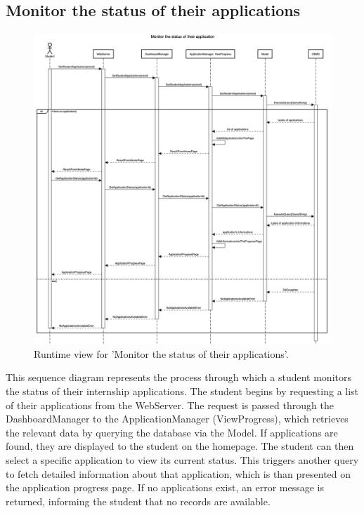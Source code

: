 \subsection{Monitor the status of their applications}
\begin{figure}[H]
    \begin{center}
        \includegraphics[width=0.8\linewidth]{DD/LaTeX/Images/RuntimeView/MonitorStatusApplication.png}
        \caption{Runtime view for 'Monitor the status of their applications'.}
        \label{fig:runtime_MonitorStatusApplication}%
    \end{center}
\end{figure}

This sequence diagram represents the process through which a student monitors the status of their internship applications. The student begins by requesting a list of their applications from the WebServer. The request is passed through the DashboardManager to the ApplicationManager (ViewProgress), which retrieves the relevant data by querying the database via the Model. If applications are found, they are displayed to the student on the homepage. The student can then select a specific application to view its current status. This triggers another query to fetch detailed information about that application, which is than presented on the application progress page. If no applications exist, an error message is returned, informing the student that no records are available.

